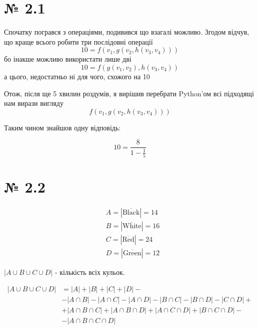 \documentclass[11pt, a4paper]{article} %
\begin{document}
\section*{№ 2.1}
Спочатку погрався з операціями, подивився що взагалі можливо.
Згодом відчув, що краще всього робити три послідовні операції
$$10 = f(v_1,g(v_2, h(v_3,v_4)))$$
бо інакше можливо використати лише дві
$$10 = f(g(v_1, v_2),h(v_3,v_4))$$
а цього, недостатньо ні для чого, схожого на 10

Отож, після ще 5 хвилин роздумів, я вирішив перебрати Python'ом всі
підходящі нам вирази вигляду 
$$f(v_1,g(v_2, h(v_3,v_4)))$$

Таким чином знайшов одну відповідь:
\begin{mdframed}[style=ans]
    $$10 = \frac{8}{1-\frac{1}{5}}$$    
\end{mdframed}

\section*{№ 2.2}
\begin{align*}
    & A = |\overline{\text{Black}}| = 14 \\  
    & B = |\overline{\text{White}}| = 16 \\  
    & C = |\overline{\text{Red}}| = 24 \\  
    & D = |\overline{\text{Green}}| = 12
\end{align*}

$|A \cup B \cup C \cup D|$ - кількість всіх кульок.

\begin{align*}
    |A \cup B \cup C \cup D| &= |A| + |B| + |C| + |D| - \\
        &- |A\cap B| - |A \cap C| - |A \cap D| - |B \cap C| - |B \cap D| - |C \cap D| + \\
        &+ |A \cap B \cap C| + |A \cap B \cap D| + |A \cap C \cap D| + |B \cap C \cap D| -\\
        &- |A\cap B \cap C\cap D| 
\end{align*}
\end{document}

